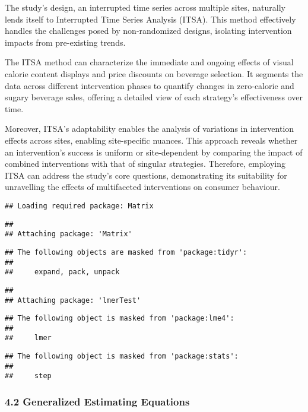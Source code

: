 \documentclass[
]{article}
\begin{document}
The study's design, an interrupted time series across multiple sites,
naturally lends itself to Interrupted Time Series Analysis (ITSA). This
method effectively handles the challenges posed by non-randomized
designs, isolating intervention impacts from pre-existing trends.

The ITSA method can characterize the immediate and ongoing effects of
visual calorie content displays and price discounts on beverage
selection. It segments the data across different intervention phases to
quantify changes in zero-calorie and sugary beverage sales, offering a
detailed view of each strategy's effectiveness over time.

Moreover, ITSA's adaptability enables the analysis of variations in
intervention effects across sites, enabling site-specific nuances. This
approach reveals whether an intervention's success is uniform or
site-dependent by comparing the impact of combined interventions with
that of singular strategies. Therefore, employing ITSA can address the
study's core questions, demonstrating its suitability for unravelling
the effects of multifaceted interventions on consumer behaviour.

\begin{verbatim}
## Loading required package: Matrix
\end{verbatim}

\begin{verbatim}
## 
## Attaching package: 'Matrix'
\end{verbatim}

\begin{verbatim}
## The following objects are masked from 'package:tidyr':
## 
##     expand, pack, unpack
\end{verbatim}

\begin{verbatim}
## 
## Attaching package: 'lmerTest'
\end{verbatim}

\begin{verbatim}
## The following object is masked from 'package:lme4':
## 
##     lmer
\end{verbatim}

\begin{verbatim}
## The following object is masked from 'package:stats':
## 
##     step
\end{verbatim}

\hypertarget{generalized-estimating-equations}{%
\subsubsection{4.2 Generalized Estimating
Equations}\label{generalized-estimating-equations}}
\end{document}
